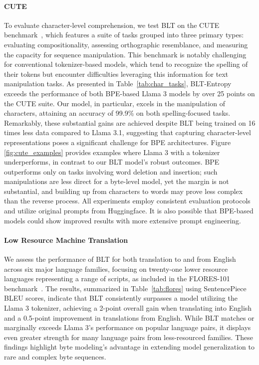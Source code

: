 \paragraph{CUTE}
To evaluate character-level comprehension, we test {\textsc BLT} on the CUTE benchmark~\citep{edman2024cute}, which features a suite of tasks grouped into three primary types: evaluating compositionality, assessing orthographic resemblance, and measuring the capacity for sequence manipulation. This benchmark is notably challenging for conventional tokenizer-based models, which tend to recognize the spelling of their tokens but encounter difficulties leveraging this information for text manipulation tasks. As presented in Table~\ref{tab:char_tasks}, {\textsc BLT}-Entropy exceeds the performance of both BPE-based Llama 3 models by over 25 points on the CUTE suite. Our model, in particular, excels in the manipulation of characters, attaining an accuracy of 99.9\% on both spelling-focused tasks. Remarkably, these substantial gains are achieved despite {\textsc BLT} being trained on 16 times less data compared to Llama 3.1, suggesting that capturing character-level representations poses a significant challenge for BPE architectures. Figure \ref{fig:cute_examples} provides examples where Llama 3 with a tokenizer underperforms, in contrast to our {\textsc BLT} model’s robust outcomes. BPE outperforms only on tasks involving word deletion and insertion; such manipulations are less direct for a byte-level model, yet the margin is not substantial, and building up from characters to words may prove less complex than the reverse process. All experiments employ consistent evaluation protocols and utilize original prompts from Huggingface. It is also possible that BPE-based models could show improved results with more extensive prompt engineering.

\paragraph{Low Resource Machine Translation} We assess the performance of {\textsc BLT} for both translation to and from English across six major language families, focusing on twenty-one lower resource languages representing a range of scripts, as included in the FLORES-101 benchmark~\citep{goyal2022flores}. The results, summarized in Table~\ref{tab:flores} using SentencePiece BLEU scores, indicate that {\textsc BLT} consistently surpasses a model utilizing the Llama 3 tokenizer, achieving a 2-point overall gain when translating into English and a 0.5-point improvement in translations from English. While {\textsc BLT} matches or marginally exceeds Llama 3's performance on popular language pairs, it displays even greater strength for many language pairs from less-resourced families. These findings highlight byte modeling’s advantage in extending model generalization to rare and complex byte sequences.

